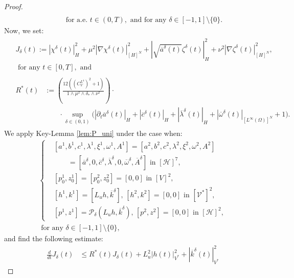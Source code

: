 \documentclass{sinst}
\numberwithin{equation}{section}
\theoremstyle{plain}
\theoremstyle{definition}
\def\sH{\mathscr{H}}
\def\sP{\mathscr{P}}
\def\sV{\mathscr{V}}
\begin{document}
\begin{proof}
\begin{align}
    \\
    &\qquad \mbox{ for a.e. } t \in (0,T), \mbox{ and for any } \delta \in [-1,1] \setminus \{ 0 \}.
  \end{align}
  Now, we set:
  \begin{align}
    &\begin{gathered}
      J_\delta(t) := |\chi^\delta(t)|_H^2 + \mu^2 |\nabla \chi^\delta(t)|_{[H]^N}^2 + |\sqrt{\overline{a}^\delta(t)} \zeta^\delta(t)|_H^2 + \nu^2 |\nabla \zeta^\delta(t)|_{[H]^N}^2,
      \\
      \mbox{ for any } t \in [0,T], \mbox{ and }
    \end{gathered}
    \\
    &\begin{aligned}
      R^{*}(t) &:= \left( \frac{12((C_V^{L^4})^2 + 1)}{1 \wedge \mu^2 \wedge \delta_* \wedge \nu^2} \right) \cdot
      \\
      &\qquad \cdot \sup_{\delta \in (0,1)} \bigl(|\partial_t \overline{a}^\delta(t)|_H + |\overline{c}^\delta(t)|_H + |\overline{\lambda}^\delta(t)|_H + |\overline{\omega}^\delta(t)|_{[L^\infty(\Omega)]^N} + 1 \bigr).
    \end{aligned}
  \end{align}
  We apply Key-Lemma \ref{lem:P_uni} under the case when:
  \begin{gather}
    \left\{ \begin{aligned}
      &[a^1, b^1, c^1, \lambda^1, \xi^1, \omega^1, A^1] = [a^2, b^2, c^2, \lambda^2, \xi^2, \omega^2, A^2] 
      \\
      &\qquad = [\overline{a}^\delta, 0, \overline{c}^\delta, \overline{\lambda}^\delta, 0, \overline{\omega}^\delta, \overline{A}^\delta] \mbox{ in } [\sH]^7,
      \\
      &[p_0^1, z_0^1] = [p_0^2, z_0^2] = [0,0] \mbox{ in } [V]^2,
      \\
      &[h^1, k^1] = [L_u h, \overline{k}^\delta], \, [h^2, k^2] = [0,0] \mbox{ in } [\sV^*]^2,
      \\
      &[p^1,z^1] = \sP_\delta(L_u h, \overline{k}^\delta), \, [p^2, z^2] = [0,0] \mbox{ in } [\sH]^2,
    \end{aligned} \right.
    \\
    \mbox{ for any } \delta \in [-1,1] \setminus \{ 0 \},
  \end{gather}
  and find the following estimate:
  \begin{align}
    \frac{d}{dt}J_\delta(t) &\leq R^*(t) J_\delta(t) + L_u^2 |h(t)|_{V^*}^2 + |\overline{k}^\delta(t)|_{V^*}^2

\end{align}
\end{proof}
\end{document}
